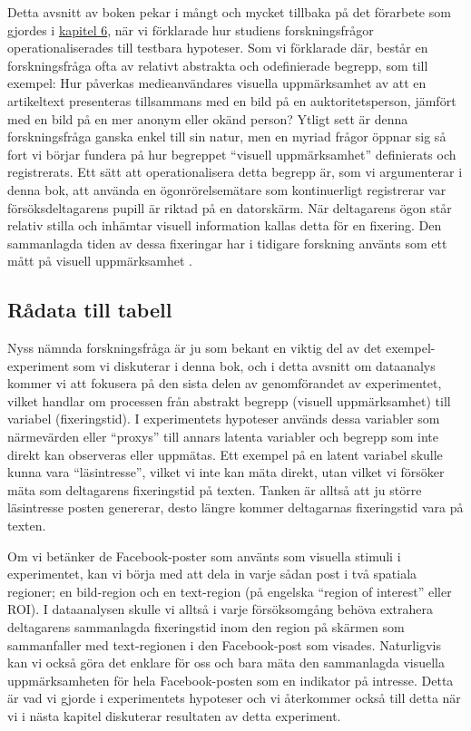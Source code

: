 \documentclass[
]{book}
\begin{document}
Detta avsnitt av boken pekar i mångt och mycket tillbaka på det förarbete som gjordes i \protect\hyperlink{sec06.3}{kapitel 6}, när vi förklarade hur studiens forskningsfrågor operationaliserades till testbara hypoteser. Som vi förklarade där, består en forskningsfråga ofta av relativt abstrakta och odefinierade begrepp, som till exempel: Hur påverkas medieanvändares visuella uppmärksamhet av att en artikeltext presenteras tillsammans med en bild på en auktoritetsperson, jämfört med en bild på en mer anonym eller okänd person? Ytligt sett är denna forskningsfråga ganska enkel till sin natur, men en myriad frågor öppnar sig så fort vi börjar fundera på hur begreppet ``visuell uppmärksamhet'' definierats och registrerats. Ett sätt att operationalisera detta begrepp är, som vi argumenterar i denna bok, att använda en ögonrörelsemätare som kontinuerligt registrerar var försöksdeltagarens pupill är riktad på en datorskärm. När deltagarens ögon står relativ stilla och inhämtar visuell information kallas detta för en fixering. Den sammanlagda tiden av dessa fixeringar har i tidigare forskning använts som ett mått på visuell uppmärksamhet \citep{holmqvist2011eye}.

\hypertarget{sub07.7.1}{%
\subsection{Rådata till tabell}\label{sub07.7.1}}

Nyss nämnda forskningsfråga är ju som bekant en viktig del av det exempel-experiment som vi diskuterar i denna bok, och i detta avsnitt om dataanalys kommer vi att fokusera på den sista delen av genomförandet av experimentet, vilket handlar om processen från abstrakt begrepp (visuell uppmärksamhet) till variabel (fixeringstid). I experimentets hypoteser används dessa variabler som närmevärden eller ``proxys'' till annars latenta variabler och begrepp som inte direkt kan observeras eller uppmätas. Ett exempel på en latent variabel skulle kunna vara ``läsintresse'', vilket vi inte kan mäta direkt, utan vilket vi försöker mäta som deltagarens fixeringstid på texten. Tanken är alltså att ju större läsintresse posten genererar, desto längre kommer deltagarnas fixeringstid vara på texten.

Om vi betänker de Facebook-poster som använts som visuella stimuli i experimentet, kan vi börja med att dela in varje sådan post i två spatiala regioner; en bild-region och en text-region (på engelska ``region of interest'' eller ROI). I dataanalysen skulle vi alltså i varje försöksomgång behöva extrahera deltagarens sammanlagda fixeringstid inom den region på skärmen som sammanfaller med text-regionen i den Facebook-post som visades. Naturligvis kan vi också göra det enklare för oss och bara mäta den sammanlagda visuella uppmärksamheten för hela Facebook-posten som en indikator på intresse. Detta är vad vi gjorde i experimentets hypoteser och vi återkommer också till detta när vi i nästa kapitel diskuterar resultaten av detta experiment.
\end{document}
